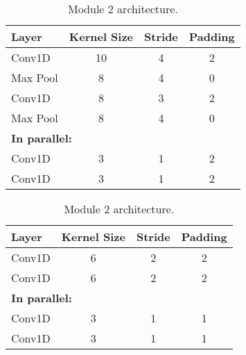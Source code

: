 \newcommand\nocell[1]{\multicolumn{#1}{c|}{}}
\setcellgapes{2pt}

\begin{table}[htbp]
	\centering
	\renewcommand{\arraystretch}{1.2} %
	\begin{minipage}{0.45\textwidth}
		\centering
		\begin{tabular}{|l|c|c|c|}
			\hline
			\textbf{Layer} & \textbf{Kernel Size} & \textbf{Stride} & \textbf{Padding} \\ \hline
			Conv1D         & 10                   & 4               & 2                \\ \hline
			Max Pool       & 8                    & 4               & 0                \\ \hline
			Conv1D         & 8                    & 3               & 2                \\ \hline
			Max Pool       & 8                    & 4               & 0                \\ \hline
			\multicolumn{4}{|l|}{\textbf{In parallel:}}									\\ \hline
			Conv1D         & 3                    & 1               & 2                \\ \hline
			Conv1D         & 3                    & 1               & 2                \\ \hline
		\end{tabular}
		\caption{Module 1 architecture.}
		\label{tab:architecure-module-1}
	\end{minipage}
	\hfill
	\begin{minipage}{0.45\textwidth}
		\centering
		\begin{tabular}{|l|c|c|c|}
			\hline
			\textbf{Layer} & \textbf{Kernel Size} & \textbf{Stride} & \textbf{Padding} \\ \hline
			Conv1D         & 6                    & 2               & 2                \\ \hline
			Conv1D         & 6                    & 2               & 2                \\ \hline
			\multicolumn{4}{|l|}{\textbf{In parallel:}}									\\ \hline
			Conv1D         & 3                    & 1              & 1                \\ \hline
			Conv1D         & 3                    & 1               & 1                \\ \hline
		\end{tabular}
		\caption{Module 2 architecture.}
		\label{tab:architecure-module-2}
	\end{minipage}
\end{table}
